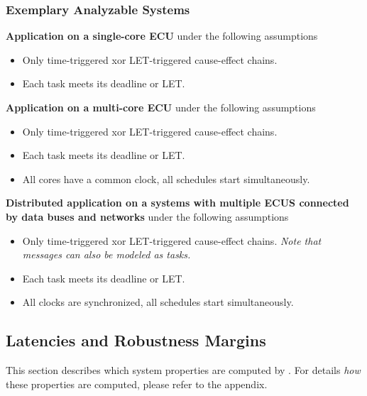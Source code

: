\newpage
\subsubsection{Exemplary Analyzable Systems}
\label{sec:system-model-examples}

\textbf{Application on a single-core ECU} under the following assumptions
\begin{itemize}
	\item Only time-triggered xor LET-triggered cause-effect chains.
	\item Each task meets its deadline or LET.
\end{itemize}

\textbf{Application on a multi-core ECU} under the following assumptions
\begin{itemize}
	\item Only time-triggered xor LET-triggered cause-effect chains.
	\item Each task meets its deadline or LET.
	\item All cores have a common clock, all schedules start simultaneously.
\end{itemize}
%
\textbf{Distributed application on a systems with multiple ECUS connected by data buses and networks} under the following assumptions
	\begin{itemize}
	\item Only time-triggered xor LET-triggered cause-effect chains. 
	\emph{Note that messages can also be modeled as tasks.}
	\item Each task meets its deadline or LET.
	\item All clocks are synchronized, all schedules start simultaneously.
\end{itemize} 
	
\newpage
\subsection{Latencies and Robustness Margins}
\label{sec:outputs}
This section describes which system properties are computed by \Tool. 
For details \emph{how} these properties are computed, please refer to the appendix.


